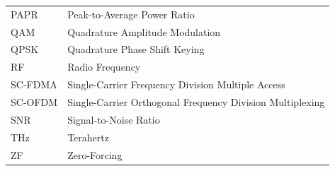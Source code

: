 \begin{tabularx}{\textwidth}{L{0.45} L{1.55}}
PAPR      & Peak-to-Average Power Ratio \\

QAM       & Quadrature Amplitude Modulation \\

QPSK      & Quadrature Phase Shift Keying \\

RF        & Radio Frequency \\

SC-FDMA   & Single-Carrier Frequency Division Multiple Access \\

SC-OFDM   & Single-Carrier Orthogonal Frequency Division Multiplexing \\

SNR       & Signal-to-Noise Ratio \\

THz       & Terahertz \\

ZF        & Zero-Forcing \\

\end{tabularx}

\newpage